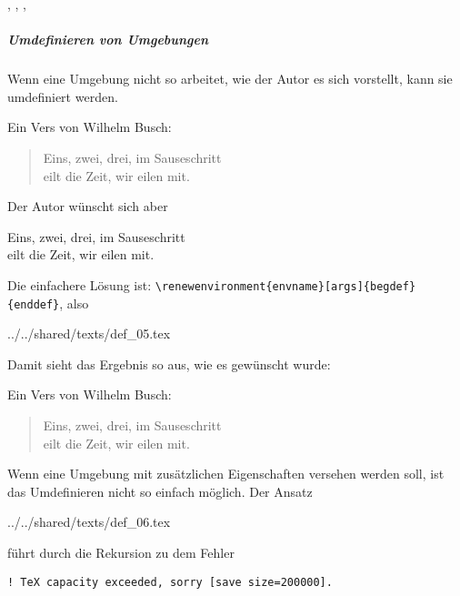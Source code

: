 \documentclass[ngerman,               %
               a4paper,               %
               fleqn,                 %
                     ]{scrartcl}       %
\begin{document}


, , , 


\subparagraph{Umdefinieren von Umgebungen}

Wenn eine Umgebung nicht so arbeitet, wie der Autor es sich vorstellt,
kann sie umdefiniert werden.

Ein Vers von Wilhelm Busch:
\begin{verse}
  Eins, zwei, drei, im Sauseschritt \\
  eilt die Zeit, wir eilen mit.
\end{verse}

Der Autor wünscht sich aber
\begin{center}
  Eins, zwei, drei, im Sauseschritt \\
  eilt die Zeit, wir eilen mit.
\end{center}

Die einfachere Lösung ist:
\lstinline|\renewenvironment{envname}[args]{begdef}{enddef}|, also
\begin{verbatimwrite}{../../shared/texts/def_05.tex}
\renewenvironment{verse}{\begin{center}}{\end{center}}
\end{verbatimwrite}



Damit sieht das Ergebnis so aus, wie es gewünscht wurde:

Ein Vers von Wilhelm Busch:
\begin{verse}
  Eins, zwei, drei, im Sauseschritt \\
  eilt die Zeit, wir eilen mit.
\end{verse}

Wenn eine Umgebung mit zusätzlichen Eigenschaften versehen werden soll, ist das
Umdefinieren nicht so einfach möglich. Der Ansatz
\begin{verbatimwrite}{../../shared/texts/def_06.tex}
\renewenvironment{verse}{\begin{verse}\itshape}{\end{verse}}
\end{verbatimwrite}

führt durch die Rekursion zu dem Fehler
\begin{lstlisting}[style=output]
! TeX capacity exceeded, sorry [save size=200000].
\end{lstlisting}
\end{document}
